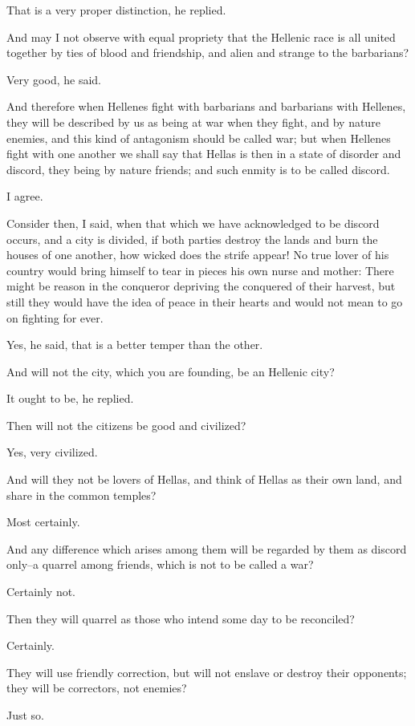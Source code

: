 That is a very proper distinction, he replied.

And may I not observe with equal propriety that the Hellenic race is all
united together by ties of blood and friendship, and alien and strange
to the barbarians?

Very good, he said.

And therefore when Hellenes fight with barbarians and barbarians with
Hellenes, they will be described by us as being at war when they fight,
and by nature enemies, and this kind of antagonism should be called war;
but when Hellenes fight with one another we shall say that Hellas is
then in a state of disorder and discord, they being by nature friends;
and such enmity is to be called discord.

I agree.

Consider then, I said, when that which we have acknowledged to be
discord occurs, and a city is divided, if both parties destroy the lands
and burn the houses of one another, how wicked does the strife appear!
No true lover of his country would bring himself to tear in pieces his
own nurse and mother: There might be reason in the conqueror depriving
the conquered of their harvest, but still they would have the idea of
peace in their hearts and would not mean to go on fighting for ever.

Yes, he said, that is a better temper than the other.

And will not the city, which you are founding, be an Hellenic city?

It ought to be, he replied.

Then will not the citizens be good and civilized?

Yes, very civilized.

And will they not be lovers of Hellas, and think of Hellas as their own
land, and share in the common temples?

Most certainly.

And any difference which arises among them will be regarded by them as
discord only--a quarrel among friends, which is not to be called a war?

Certainly not.

Then they will quarrel as those who intend some day to be reconciled?

Certainly.

They will use friendly correction, but will not enslave or destroy their
opponents; they will be correctors, not enemies?

Just so.


